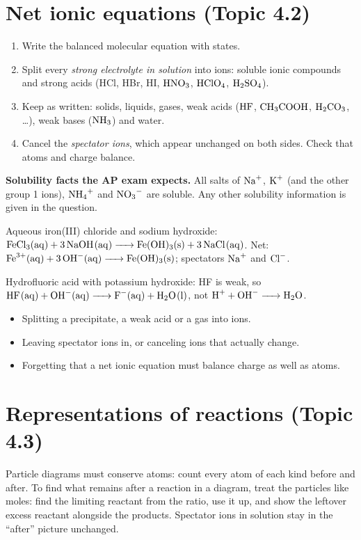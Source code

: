 \documentclass[11pt]{article}
\begin{document}
\section{Net ionic equations (Topic 4.2)}\label{t:4.2}
\begin{enumerate}
\item Write the balanced molecular equation with states.
\item Split every \emph{strong electrolyte in solution} into ions: soluble ionic compounds and strong acids (HCl, HBr, HI, $\ce{HNO3}$, $\ce{HClO4}$, $\ce{H2SO4}$).
\item Keep as written: solids, liquids, gases, weak acids ($\ce{HF}$, $\ce{CH3COOH}$, $\ce{H2CO3}$, \dots), weak bases ($\ce{NH3}$) and water.
\item Cancel the \emph{spectator ions}, which appear unchanged on both sides. Check that atoms and charge balance.
\end{enumerate}
\textbf{Solubility facts the AP exam expects.} All salts of $\ce{Na+}$, $\ce{K+}$ (and the other group 1 ions), $\ce{NH4+}$ and $\ce{NO3-}$ are soluble. Any other solubility information is given in the question.

 Aqueous iron(III) chloride and sodium hydroxide: $\ce{FeCl3(aq) + 3NaOH(aq) -> Fe(OH)3(s) + 3NaCl(aq)}$. Net: $\ce{Fe^3+(aq) + 3OH-(aq) -> Fe(OH)3(s)}$; spectators $\ce{Na+}$ and $\ce{Cl-}$.

 Hydrofluoric acid with potassium hydroxide: HF is weak, so $\ce{HF(aq) + OH-(aq) -> F-(aq) + H2O(l)}$, not $\ce{H+ + OH- -> H2O}$.

\errorsh
\begin{itemize}
\item Splitting a precipitate, a weak acid or a gas into ions.
\item Leaving spectator ions in, or canceling ions that actually change.
\item Forgetting that a net ionic equation must balance charge as well as atoms.
\end{itemize}

\section{Representations of reactions (Topic 4.3)}\label{t:4.3}
Particle diagrams must conserve atoms: count every atom of each kind before and after. To find what remains after a reaction in a diagram, treat the particles like moles: find the limiting reactant from the ratio, use it up, and show the leftover excess reactant alongside the products. Spectator ions in solution stay in the ``after'' picture unchanged.
\end{document}
